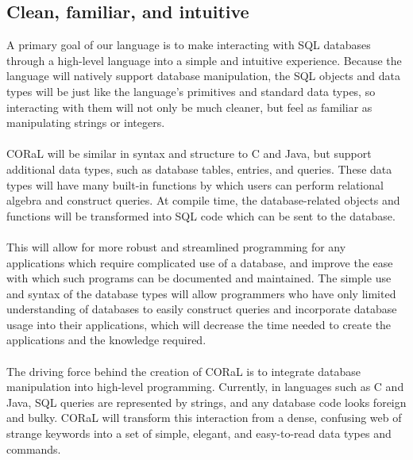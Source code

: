 \documentclass[11pt]{report}
\begin{document}
\subsection*{Clean, familiar, and intuitive}
A primary goal of our language is to make interacting with SQL databases through a high-level language into a simple and intuitive experience. Because the language will natively support database manipulation, the SQL objects and data types will be just like the language’s primitives and standard data types, so interacting with them will not only be much cleaner, but feel as familiar as manipulating strings or integers.
\\
\\
CORaL will be similar in syntax and structure to C and Java, but support additional data types, such as database tables, entries, and queries. These data types will have many built-in functions by which users can perform relational algebra and construct queries. At compile time, the database-related objects and functions will be transformed into SQL code which can be sent to the database.
\\
\\
This will allow for more robust and streamlined programming for any applications which require complicated use of a database, and improve the ease with which such programs can be documented and maintained. The simple use and syntax of the database types will allow programmers who have only limited understanding of databases to easily construct queries and incorporate database usage into their applications, which will decrease the time needed to create the applications and the knowledge required.
\\
\\
The driving force behind the creation of CORaL is to integrate database manipulation into high-level programming. Currently, in languages such as C and Java, SQL queries are represented by strings, and any database code looks foreign and bulky. CORaL will transform this interaction from a dense, confusing web of strange keywords into a set of simple, elegant, and easy-to-read data types and commands.
\end{document}
